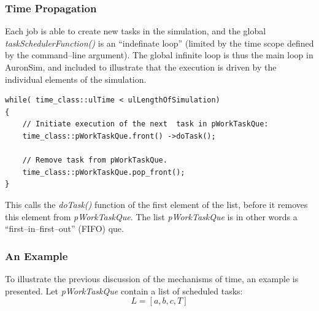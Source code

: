 	\subsubsection{Time Propagation}


%

	Each job is able to create new tasks in the simulation, and the global \emph{taskSchedulerFunction()} is an ``indefinate loop'' (limited by the time scope defined by the command--line argument).
	The global infinite loop is thus the main loop in AuronSim, and included to illustrate that the execution is driven by the individual elements of the simulation.

\begin{lstlisting}
while( time_class::ulTime < ulLengthOfSimulation)
{
	// Initiate execution of the next  task in pWorkTaskQue:
	time_class::pWorkTaskQue.front() ->doTask();

	// Remove task from pWorkTaskQue.
	time_class::pWorkTaskQue.pop_front();
}
\end{lstlisting}

	This calls the \emph{doTask()} function of the first element of the list, before it removes this element from \emph{pWorkTaskQue}.
	The list \emph{pWorkTaskQue} is in other words a ``first--in--first--out'' (FIFO) que. %
	
	\subsubsection{An Example}
	To illustrate the previous discussion of the mechanisms of time, an example is presented.
	Let \emph{pWorkTaskQue} contain a list of scheduled tasks: %
\begin{equation}
	\nonumber
	L = [a, b, c, T]
\end{equation}

